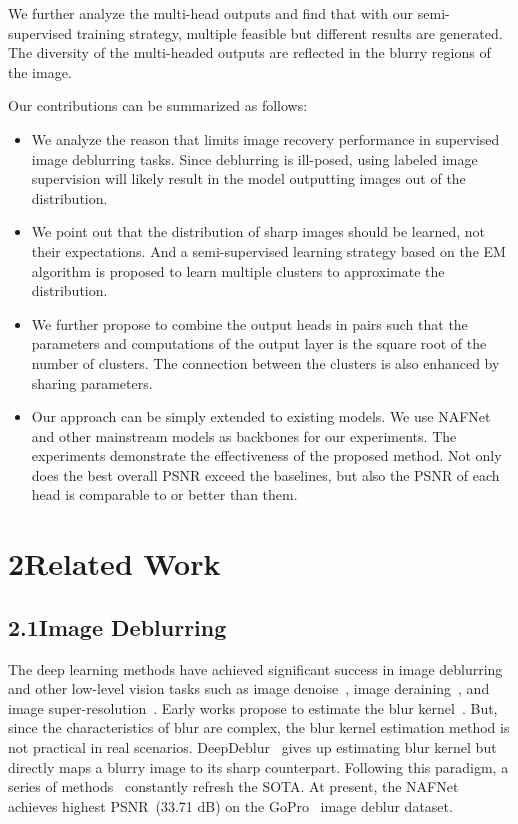 \documentclass[letterpaper]{article} \usepackage{aaai23}  \usepackage{times}  \usepackage{helvet}  \usepackage{courier}  \usepackage[hyphens]{url}  \usepackage{graphicx} \urlstyle{rm} \def\UrlFont{\rm}  \usepackage{natbib}  \usepackage{caption} \frenchspacing  \setlength{\pdfpagewidth}{8.5in} \setlength{\pdfpageheight}{11in} \usepackage{algorithm}
\begin{document}
We further analyze the multi-head outputs and find that with our semi-supervised training strategy, multiple feasible but different results are generated. The diversity of the multi-headed outputs are reflected in the blurry regions of the image.

Our contributions can be summarized as follows:

\begin{itemize}
    \item We analyze the reason that limits image recovery performance in supervised image deblurring tasks. Since deblurring is ill-posed, using labeled image supervision will likely result in the model outputting images out of the distribution.
    \item We point out that the distribution of sharp images should be learned, not their expectations. And a semi-supervised learning strategy based on the EM algorithm is proposed to learn multiple clusters to approximate the distribution.
    \item We further propose to combine the output heads in pairs such that the parameters and computations of the output layer is the square root of the number of clusters. The connection between the clusters is also enhanced by sharing parameters.
    \item Our approach can be simply extended to existing models. We use NAFNet and other mainstream models as backbones for our experiments. The experiments demonstrate the effectiveness of the proposed method. Not only does the best overall PSNR exceed the baselines, but also the PSNR of each head is comparable to or better than them.
\end{itemize}

\section{2\quad Related Work}

\subsection{2.1\quad Image Deblurring}

The deep learning methods have achieved significant success in image deblurring and other low-level vision tasks such as image denoise~\cite{tian2020deep}, image deraining~\cite{li2019single}, and image super-resolution~\cite{yang2019deep}. Early works propose to estimate the blur kernel~\cite{chakrabarti2016neural,ren2020neural,schuler2015learning,sun2015learning,tran2021explore}. But, since the characteristics of blur are complex, the blur kernel estimation method is not practical in real scenarios. DeepDeblur~\cite{Nah_2017_CVPR} gives up estimating blur kernel but directly maps a blurry image to its sharp counterpart. Following this paradigm, a series of methods~\cite{zamir2021multi,chen2021hinet,zamir2022restormer,chu2021tlc} constantly refresh the SOTA. At present, the NAFNet~\cite{chen2022simple} achieves highest PSNR~(33.71 dB) on the GoPro~\cite{Nah_2017_CVPR} image deblur dataset.
\end{document}
